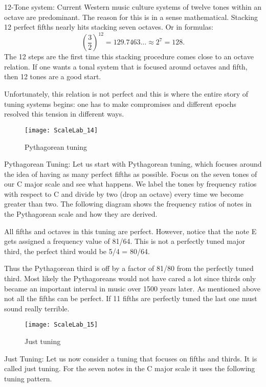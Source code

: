 12-Tone system: Current Western music culture systems of twelve tones within an octave are predominant. The reason for this is in a sense mathematical. Stacking 12 perfect fifths nearly hits stacking seven octaves. Or in formulas:
$$\left( \frac{3}{2}\right)^{12} = 129.7463 \ldots \approx 2^7 = 128 .$$
The 12 steps are the first time this stacking procedure comes close to an octave relation. If one wants a tonal system that is focused around octaves and fifth, then 12 tones are a good start.

Unfortunately, this relation is not perfect and this is where the entire story of tuning systems begins: one has to make compromises and different epochs resolved this tension in different ways.

\begin{figure}[h]
\centering
\texttt{[image: ScaleLab\_14]}
\caption*{Pythagorean tuning}
\end{figure}


Pythagorean Tuning: Let us start with Pythagorean tuning, which focuses around the idea of having as many perfect fifths as possible. Focus on the seven tones of our C major scale and see what happens. We label the tones by frequency ratios with respect to C and divide by two (drop an octave) every time we become greater than two. The following diagram shows the frequency ratios of notes in the Pythagorean scale and how they are derived.

All fifths and octaves in this tuning are perfect. However, notice that the note E gets assigned a frequency value of 81/64. This is not a perfectly tuned major third, the perfect third would be 5/4 = 80/64.

Thus the Pythagorean third is off by a factor of 81/80 from the perfectly tuned third. Most likely the Pythagoreans would not have cared a lot since thirds only became an important interval in music over 1500 years later. As mentioned above not all the fifths can be perfect. If 11 fifths are perfectly tuned the last one must sound really terrible.

\begin{figure}[h]
\centering
\texttt{[image: ScaleLab\_15]}
\caption*{Just tuning}
\end{figure}

Just Tuning: Let us now consider a tuning that focuses on fifths and thirds. It is called just tuning. For the seven notes in the C major scale it uses the following tuning pattern.


